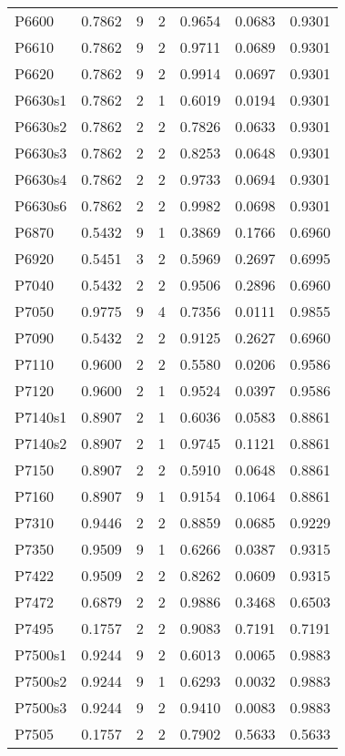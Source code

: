 \begin{table}[H]
\begin{tabular}{lrrrrrr}
P6600 & 0.7862 & 9 & 2 & 0.9654 & 0.0683 & 0.9301 \\
P6610 & 0.7862 & 9 & 2 & 0.9711 & 0.0689 & 0.9301 \\
P6620 & 0.7862 & 9 & 2 & 0.9914 & 0.0697 & 0.9301 \\
P6630s1 & 0.7862 & 2 & 1 & 0.6019 & 0.0194 & 0.9301 \\
P6630s2 & 0.7862 & 2 & 2 & 0.7826 & 0.0633 & 0.9301 \\
P6630s3 & 0.7862 & 2 & 2 & 0.8253 & 0.0648 & 0.9301 \\
P6630s4 & 0.7862 & 2 & 2 & 0.9733 & 0.0694 & 0.9301 \\
P6630s6 & 0.7862 & 2 & 2 & 0.9982 & 0.0698 & 0.9301 \\
P6870 & 0.5432 & 9 & 1 & 0.3869 & 0.1766 & 0.6960 \\
P6920 & 0.5451 & 3 & 2 & 0.5969 & 0.2697 & 0.6995 \\
P7040 & 0.5432 & 2 & 2 & 0.9506 & 0.2896 & 0.6960 \\
P7050 & 0.9775 & 9 & 4 & 0.7356 & 0.0111 & 0.9855 \\
P7090 & 0.5432 & 2 & 2 & 0.9125 & 0.2627 & 0.6960 \\
P7110 & 0.9600 & 2 & 2 & 0.5580 & 0.0206 & 0.9586 \\
P7120 & 0.9600 & 2 & 1 & 0.9524 & 0.0397 & 0.9586 \\
P7140s1 & 0.8907 & 2 & 1 & 0.6036 & 0.0583 & 0.8861 \\
P7140s2 & 0.8907 & 2 & 1 & 0.9745 & 0.1121 & 0.8861 \\
P7150 & 0.8907 & 2 & 2 & 0.5910 & 0.0648 & 0.8861 \\
P7160 & 0.8907 & 9 & 1 & 0.9154 & 0.1064 & 0.8861 \\
P7310 & 0.9446 & 2 & 2 & 0.8859 & 0.0685 & 0.9229 \\
P7350 & 0.9509 & 9 & 1 & 0.6266 & 0.0387 & 0.9315 \\
P7422 & 0.9509 & 2 & 2 & 0.8262 & 0.0609 & 0.9315 \\
P7472 & 0.6879 & 2 & 2 & 0.9886 & 0.3468 & 0.6503 \\
P7495 & 0.1757 & 2 & 2 & 0.9083 & 0.7191 & 0.7191 \\
P7500s1 & 0.9244 & 9 & 2 & 0.6013 & 0.0065 & 0.9883 \\
P7500s2 & 0.9244 & 9 & 1 & 0.6293 & 0.0032 & 0.9883 \\
P7500s3 & 0.9244 & 9 & 2 & 0.9410 & 0.0083 & 0.9883 \\
P7505 & 0.1757 & 2 & 2 & 0.7902 & 0.5633 & 0.5633 \\

\end{tabular}
\end{table}
